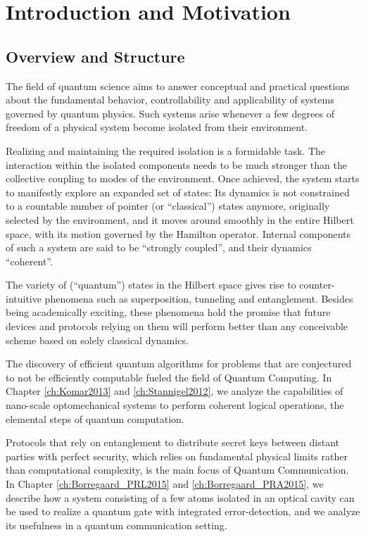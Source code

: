 \chapter{Introduction and Motivation}

\section{Overview and Structure}
The field of quantum science aims to answer conceptual and practical questions
about the fundamental behavior, controllability and applicability of 
systems governed by quantum physics. Such systems arise whenever a few 
degrees of freedom of a physical system become isolated from their environment. 

Realizing and maintaining the required isolation is a formidable
task. The interaction within the isolated components needs to be
much stronger than the collective coupling to modes of the environment.
Once achieved, the system starts to manifestly explore an expanded set of states: Its
dynamics is not constrained to a countable number of pointer (or
``classical'') states anymore, originally selected by the environment, and it
moves around smoothly in the entire Hilbert space, with its motion governed by the
Hamilton operator. Internal components of such a system are said to be ``strongly
coupled'', and their dynamics ``coherent''.

The variety of (``quantum'') states in the Hilbert space  gives rise
to counter-intuitive phenomena such as superposition, tunneling and
entanglement.
Besides being academically exciting, these phenomena hold the promise that
future devices and protocols relying on them will perform better than any
conceivable scheme based on solely classical dynamics. 

The discovery of
efficient quantum algorithms for problems that are conjectured to not be
efficiently computable fueled the field of Quantum Computing. In Chapter
\ref{ch:Komar2013} and \ref{ch:Stannigel2012}, we analyze the
capabilities of nano-scale optomechanical systems to perform coherent logical
operations, the elemental steps of quantum computation.

Protocols that
rely on entanglement to distribute secret keys between distant parties with
perfect security, which relies on fundamental physical limits rather than
computational complexity, is the main focus of Quantum Communication. In Chapter
\ref{ch:Borregaard_PRL2015} and \ref{ch:Borregaard_PRA2015}, we describe how a system consisting of a few atoms
isolated in an optical cavity can be used to realize a quantum gate with
integrated error-detection, and we analyze its usefulness in a quantum
communication setting.

